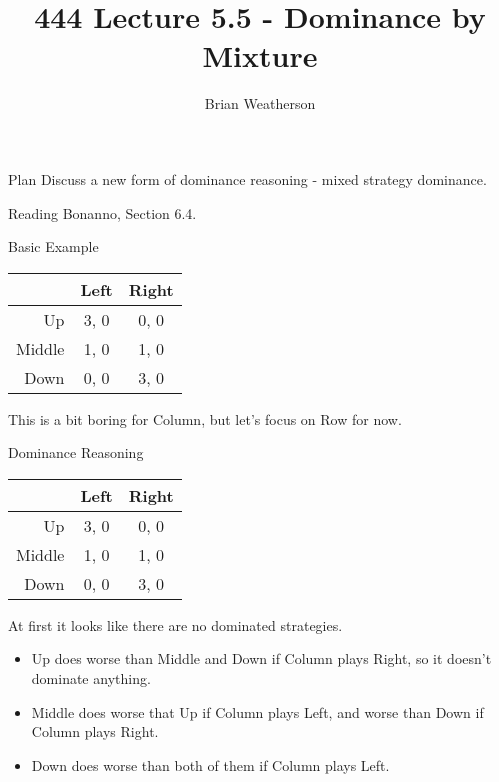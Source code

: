 \documentclass[
  ignorenonframetext,
]{beamer}
\title{444 Lecture 5.5 - Dominance by Mixture}
\author{Brian Weatherson}
\date{}
\providecommand{\tightlist}{%
  \setlength{\itemsep}{0pt}\setlength{\parskip}{0pt}}
\begin{document}
\frame{\titlepage}

\begin{frame}{Plan}
\protect\hypertarget{plan}{}
Discuss a new form of dominance reasoning - mixed strategy dominance.
\end{frame}

\begin{frame}{Reading}
\protect\hypertarget{reading}{}
Bonanno, Section 6.4.
\end{frame}

\begin{frame}{Basic Example}
\protect\hypertarget{basic-example}{}
\begin{table}[!h]
\centering
\begin{tabular}[t]{>{}r|cc}
\toprule
 & Left & Right\\
\midrule
Up & 3, 0 & 0, 0\\
Middle & 1, 0 & 1, 0\\
Down & 0, 0 & 3, 0\\
\bottomrule
\end{tabular}
\end{table}

This is a bit boring for Column, but let's focus on Row for now.
\end{frame}

\begin{frame}{Dominance Reasoning}
\protect\hypertarget{dominance-reasoning}{}
\begin{table}[!h]
\centering
\begin{tabular}[t]{>{}r|cc}
\toprule
 & Left & Right\\
\midrule
Up & 3, 0 & 0, 0\\
Middle & 1, 0 & 1, 0\\
Down & 0, 0 & 3, 0\\
\bottomrule
\end{tabular}
\end{table}

At first it looks like there are no dominated strategies.

\begin{itemize}
\tightlist
\item
  Up does worse than Middle and Down if Column plays Right, so it
  doesn't dominate anything.
\item
  Middle does worse that Up if Column plays Left, and worse than Down if
  Column plays Right.
\item
  Down does worse than both of them if Column plays Left.
\end{itemize}
\end{frame}
\end{document}
